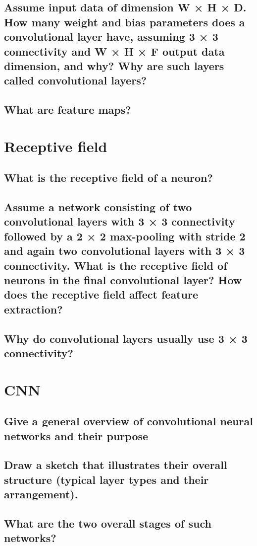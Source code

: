 \subsection{Assume input data of dimension W × H × D. How many weight and bias parameters does a convolutional layer have, assuming 3 × 3 connectivity and W × H × F output data dimension, and why? Why are such layers called convolutional layers?}
\subsection{What are feature maps?}

\section{Receptive field}
\subsection{What is the receptive field of a neuron?}
\subsection{Assume a network consisting of two convolutional layers with 3 × 3 connectivity followed by a 2 × 2 max-pooling with stride 2 and again two convolutional layers with 3 × 3 connectivity. What is the receptive field of neurons in the final convolutional layer? How does the receptive field affect feature extraction? }
\subsection{Why do convolutional layers usually use 3 × 3 connectivity?}


\section{CNN}
\subsection{Give a general overview of convolutional neural networks and their purpose}
\subsection{Draw a sketch that illustrates their overall structure (typical layer types and their arrangement).}
\subsection{What are the two overall stages of such networks?}

